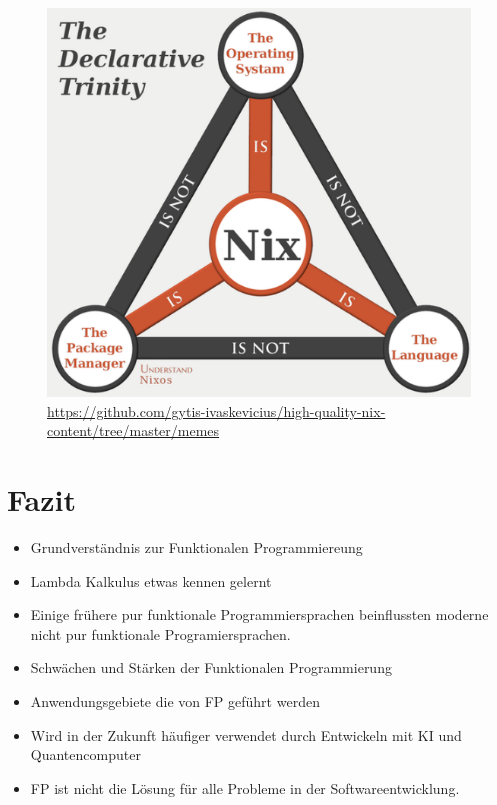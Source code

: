 \documentclass{beamer}
\begin{document}
\begin{frame}
    \begin{figure}
    \centering
    \includegraphics[width=0.7\linewidth]{bilder/nix.png}
    \textmd{\tiny \url{https://github.com/gytis-ivaskevicius/high-quality-nix-content/tree/master/memes} }
\end{figure}

\end{frame}

\section{Fazit}
\begin{frame}
	\begin{itemize}
		\item Grundverständnis zur Funktionalen Programmiereung
		\item Lambda Kalkulus etwas kennen gelernt
		\item Einige frühere pur funktionale Programmiersprachen beinflussten moderne nicht pur funktionale Programiersprachen.
		\item Schwächen und Stärken der Funktionalen Programmierung
         \item Anwendungsgebiete die von FP geführt werden
         \item Wird in der Zukunft häufiger verwendet durch Entwickeln mit KI und Quantencomputer
         \item FP ist nicht die Lösung für alle Probleme in der Softwareentwicklung.
        \end{itemize}
\end{frame}
\end{document}
